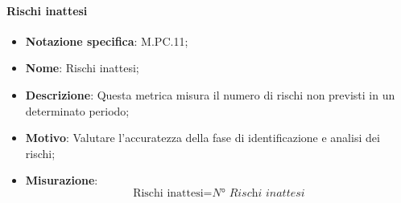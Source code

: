 
\paragraph*{Rischi inattesi}
\begin{itemize}
    \item \textbf{Notazione specifica}: M.PC.11;
    \item \textbf{Nome}: Rischi inattesi;
    \item \textbf{Descrizione}: Questa metrica misura il numero di rischi non previsti in un determinato periodo;
    \item \textbf{Motivo}: Valutare l'accuratezza della fase di identificazione e analisi dei rischi;
    \item \textbf{Misurazione}:
    \[
        \text{Rischi inattesi} = \textit{N° Rischi inattesi}
    \]
\end{itemize}

